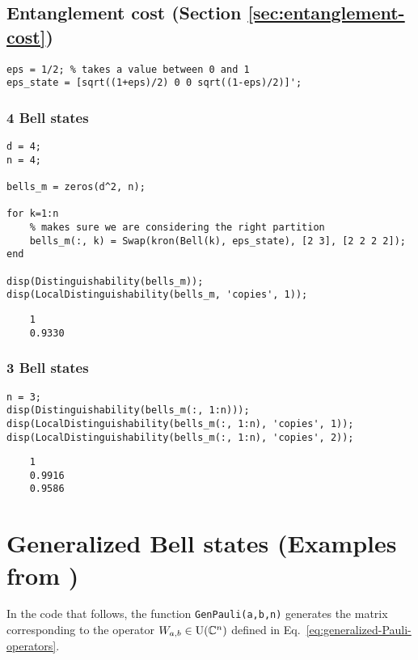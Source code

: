 \subsection*{Entanglement cost (Section \ref{sec:entanglement-cost})} 

\begin{verbatim}
eps = 1/2; % takes a value between 0 and 1
eps_state = [sqrt((1+eps)/2) 0 0 sqrt((1-eps)/2)]';
\end{verbatim}


\subsubsection*{4 Bell states}

\begin{verbatim}
d = 4;
n = 4;

bells_m = zeros(d^2, n);

for k=1:n
    % makes sure we are considering the right partition
    bells_m(:, k) = Swap(kron(Bell(k), eps_state), [2 3], [2 2 2 2]);
end

disp(Distinguishability(bells_m));
disp(LocalDistinguishability(bells_m, 'copies', 1));
\end{verbatim}\color{lightgray}\begin{verbatim}     
    1
    0.9330
\end{verbatim} 
\color{black}
    
\subsubsection*{3 Bell states}

\begin{verbatim}
n = 3;
disp(Distinguishability(bells_m(:, 1:n)));
disp(LocalDistinguishability(bells_m(:, 1:n), 'copies', 1));
disp(LocalDistinguishability(bells_m(:, 1:n), 'copies', 2));
\end{verbatim}
\color{lightgray} 
\begin{verbatim}     
    1
    0.9916
    0.9586
\end{verbatim} \color{black}

\section*{Generalized Bell states (Examples from \cite{Ghosh04})}
In the code that follows, the function \texttt{GenPauli(a,b,n)} generates the 
matrix corresponding to the operator $W_{a,b}\in\mathrm{U}(\mathbb{C}^{n})$ 
defined in Eq.~\eqref{eq:generalized-Pauli-operators}.
